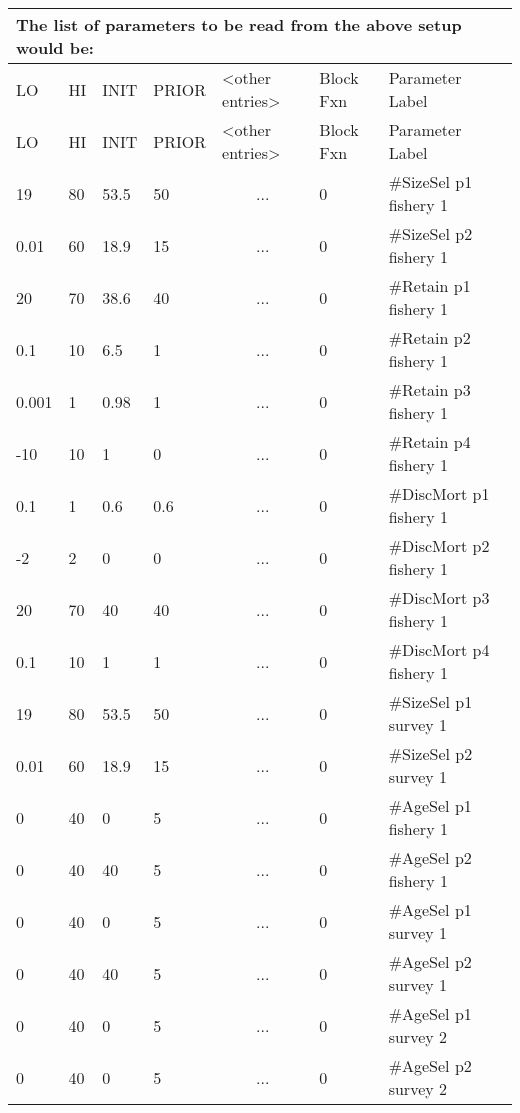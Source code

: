 \begin{longtable}{p{1cm} p{1cm} p{1cm}  p{1.5cm}  p{2.9cm}  p{1.9cm}  p{4.2cm}}
	\multicolumn{7}{l}{The list of parameters to be read from the above setup would be:}\\
	\hline
	LO \Tstrut & HI & INIT & PRIOR &  <other entries> & Block Fxn & Parameter Label\Bstrut\\
	\hline
	\endfirsthead

	\hline
	LO \Tstrut & HI & INIT & PRIOR & <other entries> & Block Fxn & Parameter Label\Bstrut\\
	\hline
	\endhead
		
	19    & 80   & 53.5 & 50  & \multicolumn{1}{c}{...}  & 0   & \#SizeSel p1 fishery 1\Tstrut\\
	0.01  & 60   & 18.9 & 15  & \multicolumn{1}{c}{...}  & 0   & \#SizeSel p2 fishery 1 \\
	20    & 70   & 38.6 & 40  & \multicolumn{1}{c}{...}  & 0   & \#Retain p1 fishery 1\\
	0.1   & 10   & 6.5  & 1   & \multicolumn{1}{c}{...}  & 0   & \#Retain p2 fishery 1\\
	0.001 & 1    & 0.98 & 1   & \multicolumn{1}{c}{...}  & 0   & \#Retain p3 fishery 1\\
	-10   & 10   & 1    & 0   & \multicolumn{1}{c}{...}  & 0   & \#Retain p4 fishery 1\\
	0.1   & 1    & 0.6  & 0.6 & \multicolumn{1}{c}{...}  & 0   & \#DiscMort p1 fishery 1\\
	-2    & 2    & 0    & 0   & \multicolumn{1}{c}{...}  & 0   & \#DiscMort p2 fishery 1\\
	20    & 70   & 40   & 40  & \multicolumn{1}{c}{...}  & 0   & \#DiscMort p3 fishery 1\\
	0.1   & 10   & 1    & 1   & \multicolumn{1}{c}{...}  & 0   & \#DiscMort p4 fishery 1\\
	19    & 80   & 53.5 & 50  & \multicolumn{1}{c}{...}  & 0   & \#SizeSel p1 survey 1\\
	0.01  & 60   & 18.9 & 15  & \multicolumn{1}{c}{...}  & 0   & \#SizeSel p2 survey 1 \\
	0     & 40   & 0    & 5   & \multicolumn{1}{c}{...}  & 0   & \#AgeSel p1 fishery 1\\
	0     & 40   & 40   & 5   & \multicolumn{1}{c}{...}  & 0   & \#AgeSel p2 fishery 1\\
	0     & 40   & 0    & 5   & \multicolumn{1}{c}{...}  & 0   & \#AgeSel p1 survey 1\\
	0     & 40   & 40   & 5   & \multicolumn{1}{c}{...}  & 0   & \#AgeSel p2 survey 1\\
	0     & 40   & 0    & 5   & \multicolumn{1}{c}{...}  & 0   & \#AgeSel p1 survey 2\\
	0     & 40   & 0    & 5   & \multicolumn{1}{c}{...}  & 0   & \#AgeSel p2 survey 2\Bstrut\\
	\hline
\end{longtable}


